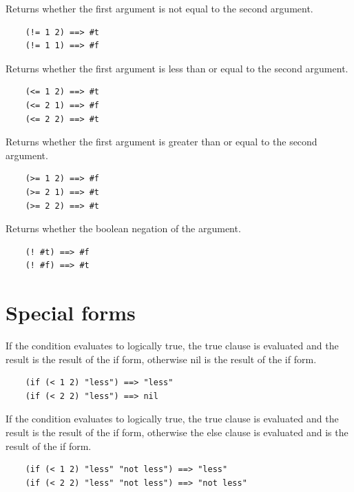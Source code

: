 \documentclass[12pt]{article}
\begin{document}
Returns whether the first argument is not equal to the second argument.

\begin{verbatim}
    (!= 1 2) ==> #t
    (!= 1 1) ==> #f
\end{verbatim}


Returns whether the first argument is less than or equal to the second argument.

\begin{verbatim}
    (<= 1 2) ==> #t
    (<= 2 1) ==> #f
    (<= 2 2) ==> #t
\end{verbatim}


Returns whether the first argument is greater than or equal to the second argument.

\begin{verbatim}
    (>= 1 2) ==> #f
    (>= 2 1) ==> #t
    (>= 2 2) ==> #t
\end{verbatim}


Returns whether the boolean negation of the argument.

\begin{verbatim}
    (! #t) ==> #f
    (! #f) ==> #t
\end{verbatim}

\section{Special forms}


If the condition evaluates to logically true, the true clause is evaluated and the result is the result of the if form, otherwise nil is the result of the if form.

\begin{verbatim}
    (if (< 1 2) "less") ==> "less"
    (if (< 2 2) "less") ==> nil
\end{verbatim}


If the condition evaluates to logically true, the true clause is evaluated and the result is the result of the if form, otherwise the else clause is evaluated and is the result of the if form.

\begin{verbatim}
    (if (< 1 2) "less" "not less") ==> "less"
    (if (< 2 2) "less" "not less") ==> "not less"
\end{verbatim}
\end{document}
